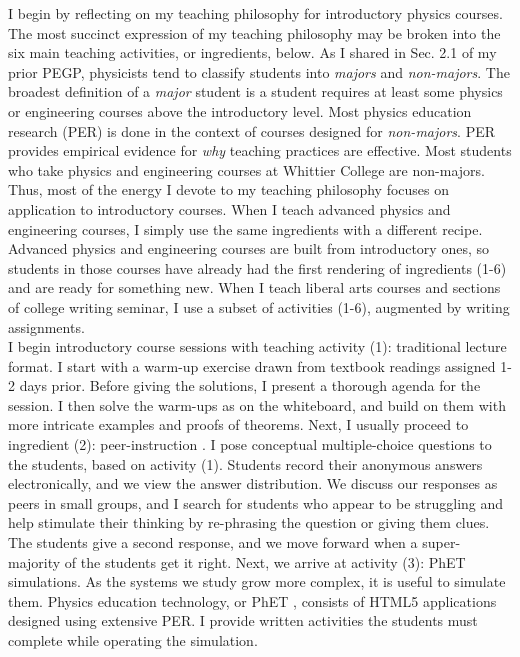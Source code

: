 \documentclass[../../../main.tex]{subfiles}
\begin{document}
I begin by reflecting on my teaching philosophy for introductory physics courses.  The most succinct expression of my teaching philosophy may be broken into the six main teaching activities, or ingredients, below.  As I shared in Sec. 2.1 of my prior PEGP, physicists tend to classify students into \textit{majors} and \textit{non-majors}.  The broadest definition of a \textit{major} student is a student requires at least some physics or engineering courses above the introductory level.  Most physics education research (PER) is done in the context of courses designed for \textit{non-majors}.  PER provides empirical evidence for \textit{why} teaching practices are effective.  Most students who take physics and engineering courses at Whittier College are non-majors.  Thus, most of the energy I devote to my teaching philosophy focuses on application to introductory courses.  When I teach advanced physics and engineering courses, I simply use the same ingredients with a different recipe.  Advanced physics and engineering courses are built from introductory ones, so students in those courses have already had the first rendering of ingredients (1-6) and are ready for something new.  When I teach liberal arts courses and sections of college writing seminar, I use a subset of activities (1-6), augmented by writing assignments.
\\
\vspace{0.25cm}
I begin introductory course sessions with teaching activity (1): traditional lecture format.  I start with a warm-up exercise drawn from textbook readings assigned 1-2 days prior.  Before giving the solutions, I present a thorough agenda for the session.  I then solve the warm-ups as on the whiteboard, and build on them with more intricate examples and proofs of theorems.  Next, I usually proceed to ingredient (2): peer-instruction \cite{mazur2013peer}.  I pose conceptual multiple-choice questions to the students, based on activity (1).  Students record their anonymous answers electronically, and we view the answer distribution.  We discuss our responses as peers in small groups, and I search for students who appear to be struggling and help stimulate their thinking by re-phrasing the question or giving them clues.  The students give a second response, and we move forward when a super-majority of the students get it right.  Next, we arrive at activity (3): PhET simulations.  As the systems we study grow more complex, it is useful to simulate them.  Physics education technology, or PhET \cite{phet}, consists of HTML5 applications designed using extensive PER.  I provide written activities the students must complete while operating the simulation.
\end{document}
